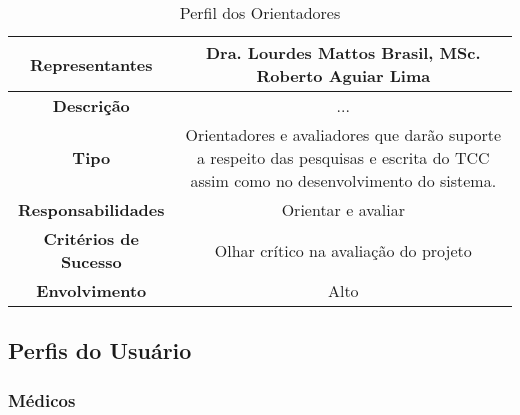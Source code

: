 \begin{anexosenv}
    \begin{table}[]
        \centering
        \caption{Perfil dos Orientadores}
        \begin{tabular}{@{}|c|c|@{}}
        \toprule
        \textbf{Representantes}       & Dra. Lourdes Mattos Brasil, MSc. Roberto Aguiar Lima                                                                             \\ \midrule
        \textbf{Descrição}            & ...                                                                                                                              \\ \midrule
        \textbf{Tipo}                 & Orientadores e avaliadores que darão suporte a respeito das pesquisas e escrita do TCC assim como no desenvolvimento do sistema. \\ \midrule
        \textbf{Responsabilidades}    & Orientar e avaliar                                                                                                               \\ \midrule
        \textbf{Critérios de Sucesso} & Olhar crítico na avaliação do projeto                                                                                            \\ \midrule
        \textbf{Envolvimento}         & Alto                                                                                                                             \\ \bottomrule
        \end{tabular}
        \label{table:Perfil dos Orientadores}
    \end{table}

\subsection{Perfis do Usuário}

\subsubsection{Médicos}


\end{anexosenv}
